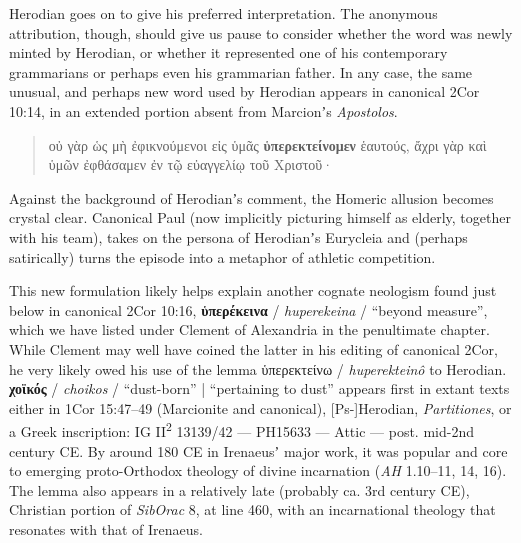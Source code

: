 Herodian goes on to give his preferred interpretation. %
The anonymous attribution, though, %
should give us pause to consider whether the word was newly minted by Herodian, %
or whether it represented one of his contemporary grammarians or perhaps even his grammarian father. %
In any case, the same unusual, and perhaps new word used by Herodian appears %
in canonical 2Cor 10:14, in an extended portion absent from Marcionʼs \textit{Apostolos}. %

\vspace*{2mm} 
 \begin{quote}οὐ γὰρ ὡς μὴ ἐφικνούμενοι εἰς ὑμᾶς \textbf{ὑπερεκτείνομεν} ἑαυτούς, %
 ἄχρι γὰρ καὶ ὑμῶν ἐφθάσαμεν ἐν τῷ εὐαγγελίῳ τοῦ Χριστοῦ· \\[1mm] %
 \end{quote} %
 \vspace*{2mm}

\noindent{}Against the background of Herodianʼs comment, %
the Homeric allusion becomes crystal clear. %
Canonical Paul (now implicitly picturing himself as elderly, together with his team), %
takes on the persona of Herodianʼs Eurycleia %
and (perhaps satirically) turns the episode into a metaphor of athletic competition. %

This new formulation likely helps explain another cognate neologism found just below in canonical 2Cor 10:16, %
\textbf{ὑπερέκεινα} / \textit{huperekeina} / “beyond measure”, %
which we have listed under Clement of Alexandria in the penultimate chapter. %
While Clement may well have coined the latter in his editing of canonical 2Cor, %
he very likely owed his use of the lemma ὑπερεκτείνω / \textit{huperekteinô} to Herodian. \\[1mm] %

\noindent{}\textbf{χοϊκός} / \textit{choikos} / “dust-born” | “pertaining to dust” appears first in extant texts either in %
1Cor 15:47--49 (Marcionite and canonical), [Ps-]Herodian, \textit{Partitiones}, or a Greek inscription: IG II\textsuperscript{2} 13139/42 — PH15633 — Attic — post. mid-2nd century CE. %
By around 180 CE in Irenaeusʼ major work, it was popular and core to emerging proto-Orthodox %
theology of divine incarnation (\textit{AH} 1.10--11, 14, 16). %
The lemma also appears in a relatively late (probably ca. 3rd century CE), Christian portion of \textit{SibOrac} 8, at line 460, %
with an incarnational theology that resonates with that of Irenaeus. %